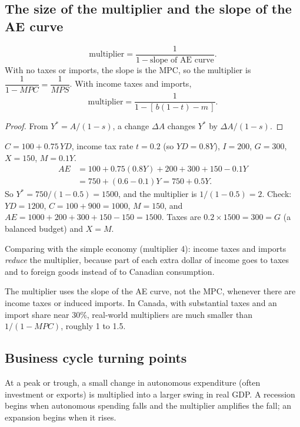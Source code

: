 \subsection{The size of the multiplier and the slope of the AE curve}

\begin{theorem}
\[
  \text{multiplier} = \frac{1}{1 - \text{slope of AE curve}}.
\]
With no taxes or imports, the slope is the MPC, so the multiplier is
$\dfrac{1}{1 - MPC} = \dfrac{1}{MPS}$. With income taxes and imports,
\[
  \text{multiplier} = \frac{1}{1 - [\,b(1 - t) - m\,]}.
\]
\end{theorem}
\begin{proof}
From $Y^{*} = A/(1 - s)$, a change $\Delta A$ changes $Y^{*}$ by $\Delta A/(1 - s)$.
\end{proof}

\begin{example}
$C = 100 + 0.75\,YD$, income tax rate $t = 0.2$ (so $YD = 0.8Y$), $I = 200$, $G = 300$,
$X = 150$, $M = 0.1Y$.
\begin{align*}
  AE &= 100 + 0.75(0.8Y) + 200 + 300 + 150 - 0.1Y \\
     &= 750 + (0.6 - 0.1)Y = 750 + 0.5Y.
\end{align*}
So $Y^{*} = 750/(1 - 0.5) = 1500$, and the multiplier is $1/(1 - 0.5) = 2$. Check:
$YD = 1200$, $C = 100 + 900 = 1000$, $M = 150$, and
$AE = 1000 + 200 + 300 + 150 - 150 = 1500$. Taxes are $0.2 \times 1500 = 300 = G$ (a
balanced budget) and $X = M$.

Comparing with the simple economy (multiplier 4): income taxes and imports
\emph{reduce} the multiplier, because part of each extra dollar of income goes to taxes
and to foreign goods instead of to Canadian consumption.
\end{example}

\begin{important}[Pitfall]
The multiplier uses the slope of the AE curve, not the MPC, whenever there are income
taxes or induced imports. In Canada, with substantial taxes and an import share near 30\%,
real-world multipliers are much smaller than $1/(1 - MPC)$, roughly 1 to 1.5.
\end{important}

\subsection{Business cycle turning points}

At a peak or trough, a small change in autonomous expenditure (often investment or
exports) is multiplied into a larger swing in real GDP. A recession begins when
autonomous spending falls and the multiplier amplifies the fall; an expansion begins when it
rises.

